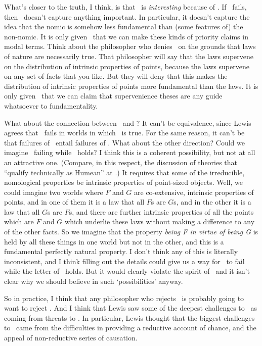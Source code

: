 What's closer to the truth, I think, is that \HS\ is \textit{interesting} because of \MC. If \MC\ fails, then \HS\ doesn't capture anything important. In particular, it doesn't capture the idea that the nomic is somehow less fundamental than (some features of) the non-nomic. It is only given \MC\ that we can make these kinds of priority claims in modal terms.  Think about the philosopher who denies \MC\  on the grounds that laws of nature are necessarily true.  That philosopher will say that the laws supervene on the distribution of intrinsic properties of points,  because the laws supervene on any set of facts that you like. But they will deny that this makes the distribution of intrinsic properties of points more fundamental than the laws.  It is only given \MC\  that we can claim that supervenience theses are any guide whatsoever to fundamentality.

What about the connection between \NR\ and \HS? It can't be equivalence, since Lewis agrees that \HS\ fails in worlds in which \NR\ is true.  For the same reason, it can't be that failures of \HS\  entail failures of \NR.  What about the other direction? Could we imagine \NR\ failing while \HS\ holds?  I think this is a coherent possibility, but not at all an attractive one. (Compare, in this respect, the discussion of theories that ``qualify technically as Humean'' at \cite[485]{Lewis1994a}.) It requires that some of the irreducible, nomological properties be intrinsic properties of point-sized objects. Well, we could imagine two worlds where $F$ and $G$ are co-extensive, intrinsic properties of points, and in one of them it is a law that all $F$s are $G$s, and in the other it is a law that all $G$s are $F$s, and there are further intrinsic properties of all the points which are $F$ and $G$ which underlie these laws without making a difference to any of the other facts. So we imagine that the property \textit{being F in virtue of being G} is held by all these things in one world but not in the other, and this is a fundamental perfectly natural property. I don't think any of this is literally inconsistent, and I think filling out the details could give us a way for \NR\ to fail while the letter of \HS\ holds. But it would clearly violate the spirit of \HS\, and it isn't clear why we should believe in such `possibilities' anyway. 

So in practice, I think that any philosopher who rejects \NR\ is probably going to want to reject \HS. And I think that Lewis saw some of the deepest challenges to \HS\ as coming from threats to \NR.  In particular, Lewis  thought that the biggest challenges to \HS\  came from the difficulties in providing a reductive account of chance, and the appeal of non-reductive series of causation.

